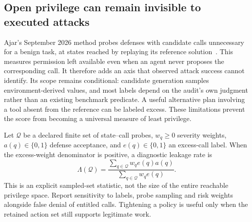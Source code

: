 \subsection{Open privilege can remain invisible to executed attacks}\label{sec:C28:ajar}
Ajar's September 2026 method probes defenses with candidate calls unnecessary for a benign task, at states reached by replaying its reference solution~\cite{sharma2026ajar}. This measures permission left available even when an agent never proposes the corresponding call. It therefore adds an axis that observed attack success cannot identify. Its scope remains conditional: candidate generation samples environment-derived values, and most labels depend on the audit's own judgment rather than an existing benchmark predicate. A useful alternative plan involving a tool absent from the reference can be labeled excess. These limitations prevent the score from becoming a universal measure of least privilege.

Let $\mathcal Q$ be a declared finite set of state--call probes, $w_q\geq0$ severity weights, $a(q)\in\{0,1\}$ defense acceptance, and $e(q)\in\{0,1\}$ an excess-call label. When the excess-weight denominator is positive, a diagnostic leakage rate is
\begin{equation}
 \Lambda(\mathcal Q)=
 \frac{\sum_{q\in\mathcal Q}w_qe(q)a(q)}
 {\sum_{q\in\mathcal Q}w_qe(q)}.
\end{equation}
This is an explicit sampled-set statistic, not the size of the entire reachable privilege space. Report sensitivity to labels, probe sampling and risk weights alongside false denial of entitled calls. Tightening a policy is useful only when the retained action set still supports legitimate work.

